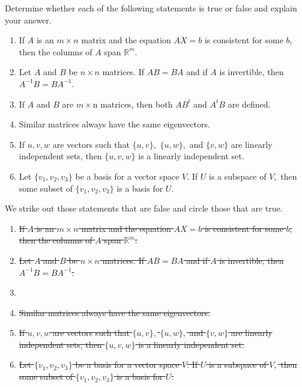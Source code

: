 \documentclass{ximera}
\author{Matthew Carr \& Marty Golubitsky}
\begin{document}

\begin{exercise}\label{mc.exercise14}

Determine whether each of the following statements is true or false and explain your answer.  
\begin{enumerate}[label=(\alph*)]
\item If $A$ is an $m\times n$ matrix and the equation $AX=b$ is consistent for some $b$, then the columns of $A$ span $\mathbb{R}^m$.
\item Let $A$ and $B$ be $n\times n$ matrices. If $AB = BA$ and if $A$ is invertible, then $A^{-1} B= B A^{-1}$. 
\item If $A$ and $B$ are $m\times$n matrices, then both $AB^t$ and $A^t B$ are defined.
\item Similar matrices always have the same eigenvectors.
\item If $u,v,w$ are vectors such that $\{u,v\},$ $\{u,w\},$ and $\{v,w\}$ are linearly independent sets, then $\{u,v,w\}$ is a linearly independent set.
\item Let $\{v_1,v_2,v_3\}$ be a basis for a vector space $V$. If $U$ is a subspace of $V,$ then some subset of $\{v_1,v_2,v_3\}$ is a basis for $U$.
\end{enumerate}
\begin{solution}

\ans 
We strike out those statements that are false and circle those that are true.
\begin{enumerate}[label=(\alph*)]
\item \sout{If $A$ is an $m\times n$ matrix and the equation $AX=b$ is consistent for some $b$, then the columns of $A$ span $\mathbb{R}^m$.}
\item \sout{Let $A$ and $B$ be $n\times n$ matrices. If $AB = BA$ and if $A$ is invertible, then $A^{-1} B= B A^{-1}$.}
\item {}
\item \sout{Similar matrices always have the same eigenvectors.}
\item \sout{If $u,v,w$ are vectors such that $\{u,v\},$ $\{u,w\},$ and $\{v,w\}$ are linearly independent sets, then $\{u,v,w\}$ is a linearly independent set.}
\item \sout{Let $\{v_1,v_2,v_3\}$ be a basis for a vector space $V$. If $U$ is a subspace of $V,$ then some subset of $\{v_1,v_2,v_3\}$ is a basis for $U$.}
\end{enumerate}


\end{solution}
\end{exercise}
\end{document}
